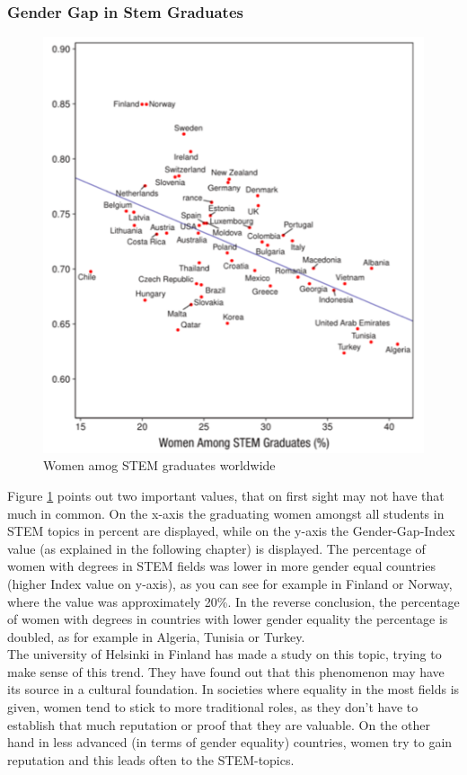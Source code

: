 	\subsubsection{Gender Gap in Stem Graduates}
	\begin{figure}[h]
		\centering
		\includegraphics[width=0.9\linewidth]{gender-index-shit}
		\caption[Women among stem graduates]{Women amog STEM graduates worldwide \cite{tgender}}
		\label{fig:gender-index-shit}
	\end{figure}
	Figure \ref{fig:gender-index-shit} points out two important values, that on first sight may not have that much in common. On the x-axis the graduating women amongst all students in STEM topics in percent are displayed, while on the y-axis the Gender-Gap-Index value (as explained in the following chapter) is displayed. The percentage of women with degrees in STEM fields was lower in more gender equal countries (higher Index value on y-axis), as you can see for example in Finland or Norway, where the value was approximately 20\%. In the reverse conclusion, the percentage of women with degrees in countries with lower gender equality the percentage is doubled, as for example in Algeria, Tunisia or Turkey. \cite{tgenderpaper2}\\
	The university of Helsinki in Finland has made a study on this topic, trying to make sense of this trend. They have found out that this phenomenon may have its source in a cultural foundation. In societies where equality in the most fields is given, women tend to stick to more traditional roles, as they don't have to establish that much reputation or proof that they are valuable. On the other hand in less advanced (in terms of gender equality) countries, women try to gain reputation and this leads often to the STEM-topics.
	
